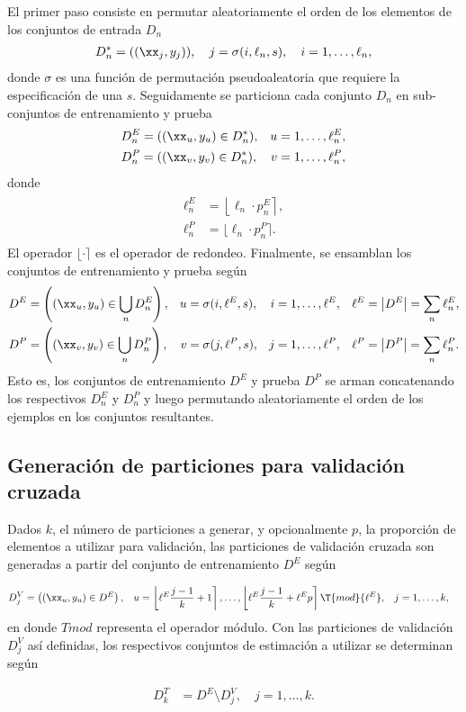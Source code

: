 El primer paso consiste en permutar aleatoriamente el orden de los
elementos de los conjuntos de entrada $D_n$
%
\begin{align}
  D^*_n = ((\xx_j,y_j)), \quad j = \sigma(i,\ell_n,s), \quad i=1,\ldots,\ell_n,
\end{align}
%
donde $\sigma$ es una función de permutación pseudoaleatoria que
requiere la especificación de una  $s$. Seguidamente se
particiona cada conjunto $D_n$ en sub-conjuntos de entrenamiento
y prueba
%
\begin{align}
  D^E_n &= ((\xx_u,y_u)\in D^*_n),& u&=1,\ldots,\ell^E_n, \\
  D^P_n &= ((\xx_v,y_v)\in D^*_n),& v&=1,\ldots,\ell^P_n,
\end{align}
%
donde
%
\begin{align}
  \begin{split}
    \ell^E_n &= \left\lfloor\ell_n\cdot p_n^E \right\rceil, \\
    \ell^P_n &= \lfloor\ell_n\cdot p_n^P\rceil.
  \end{split}
\end{align}
%
El operador $\lfloor\cdot\rceil$ es el operador de redondeo.
Finalmente, se ensamblan los conjuntos de entrenamiento y prueba según
%
\begin{align}
  D^E &= \left( (\xx_u,y_u) \in \bigcup_n {D}^E_n \right), &
  u &= \sigma(i,\ell^E,s), &
  i &= 1,\ldots,\ell^E, &
  \ell^E &= \left| D^E \right| = \sum_n \ell^E_n ,\\
  D^P &= \left( (\xx_v,y_v) \in \bigcup_n {D}^P_n \right), &
  v &= \sigma(j,\ell^P,s), &
  j &= 1,\ldots,\ell^P, &
  \ell^P &= \left| D^P \right| = \sum_n \ell^P_n .
\end{align}
%
Esto es, los conjuntos de entrenamiento $D^E$ y prueba $D^P$ se arman
concatenando los respectivos $D^E_n$ y $D^P_n$ y luego permutando
aleatoriamente el orden de los ejemplos en los conjuntos resultantes.
%
%
\subsection{Generación de particiones para validación cruzada}
%
Dados $k$, el número de particiones a generar, y opcionalmente $p$, la
proporción de elementos a utilizar para validación, las particiones de
validación cruzada son generadas a partir del conjunto de
entrenamiento $D^E$ según

\begin{align*}
  D^V_j &= \left( (\xx_u,y_u) \in {D}^E \right), &
  u &= \left\lfloor\ell^E\frac{j-1}{k}+1\right\rceil,\ldots,
  \left\lfloor\ell^E\frac{j-1}{k}+\ell^E p\right\rceil\T{mod}{\ell^E}, &
  j &= 1,\ldots,k,
\end{align*}
en donde $T{mod}$ representa el operador módulo.
Con las particiones de validación $D^V_j$ así definidas, los respectivos
conjuntos de estimación a utilizar se determinan según

\begin{align*}
  D^T_k &= D^E \setminus D^V_j, \quad j=1,\ldots,k.  
\end{align*}
